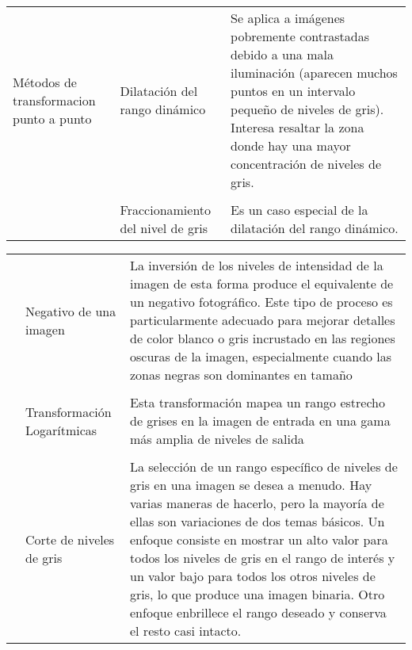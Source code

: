 \documentclass[letterpaper]{article}
\begin{document}
\begin{table}[H]
\begin{tabular}[10cm]{ 
    >{\centering\arraybackslash}m{3cm} 
    >{}m{5cm} 
    >{}m{5cm}}
        Métodos de transformacion punto a punto 
        
        & Dilatación del rango dinámico  & Se aplica a imágenes pobremente contrastadas debido a una mala iluminación (aparecen muchos puntos en un intervalo pequeño de niveles de gris). Interesa resaltar la zona donde hay una mayor concentración de niveles de gris. \\ \\


		& Fraccionamiento del nivel de gris & Es un caso especial de la dilatación del rango dinámico. \\
       
       \bottomrule
        
	\end{tabular}
    
\end{table}

\begin{table}[H]

	\centering
    
	\begin{tabular}[10cm]{ 
    >{\centering\arraybackslash}m{3cm} 
    >{}m{5cm} 
    >{}m{5cm}}
    
    \toprule
    
        & Negativo de una imagen & La inversión de los niveles de intensidad de la imagen de esta forma produce el equivalente de un negativo fotográfico. Este tipo de proceso es particularmente adecuado para mejorar detalles de color blanco o gris incrustado en las regiones oscuras de la imagen, especialmente cuando las zonas negras son dominantes en tamaño \\ \\
        
        & Transformación Logarítmicas & Esta transformación mapea un rango estrecho de grises en la imagen de entrada en una gama más amplia de niveles de salida \\ \\
        
        & Corte de niveles de gris & La selección de un rango específico de niveles de gris en una imagen se desea a menudo. Hay varias maneras de hacerlo, pero la mayoría de ellas son variaciones de dos temas básicos. Un enfoque consiste en mostrar un alto valor para todos los niveles de gris en el rango de interés y un valor bajo para todos los otros niveles de gris, lo que produce una imagen binaria. Otro enfoque enbrillece el rango deseado y conserva el resto casi intacto. \\
        
        \bottomrule
        
	\end{tabular}
    
\end{table}
\end{document}
